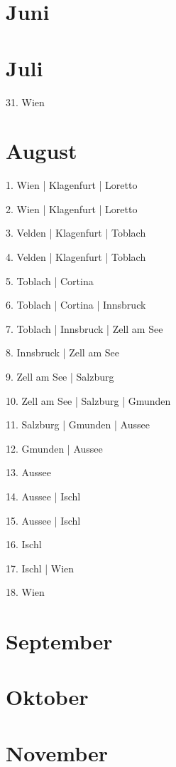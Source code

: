 \documentclass[twoside=false,titlepage=false,open=any, parskip=never, fontsize=10pt, headings=small, chapterprefix=false, appendixprefix=false, DIV=15]{scrbook}
\begin{document}
\begin{multicols}{3}
            \section*{Juni}
            \section*{Juli}
            31. Wien\par
            \section*{August}
            1. Wien | Klagenfurt | Loretto\par
            2. Wien | Klagenfurt | Loretto\par
            3. Velden | Klagenfurt | Toblach\par
            4. Velden | Klagenfurt | Toblach\par
            5. Toblach | Cortina\par
            6. Toblach | Cortina | Innsbruck\par
            7. Toblach | Innsbruck | Zell am See\par
            8. Innsbruck | Zell am See\par
            9. Zell am See | Salzburg\par
            10. Zell am See | Salzburg | Gmunden\par
            11. Salzburg | Gmunden | Aussee\par
            12. Gmunden | Aussee\par
            13. Aussee\par
            14. Aussee | Ischl\par
            15. Aussee | Ischl\par
            16. Ischl\par
            17. Ischl | Wien\par
            18. Wien\par
            \section*{September}
            \section*{Oktober}
            \section*{November}

\end{multicols}
\end{document}
